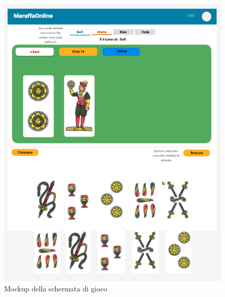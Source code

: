 \begin{figure}[h!]
    \centering 
    \includegraphics[scale=0.65]{report/img/game_mockup.png}
    \caption{ Mockup della schermata di gioco}
    \label{mockup}
\end{figure}
